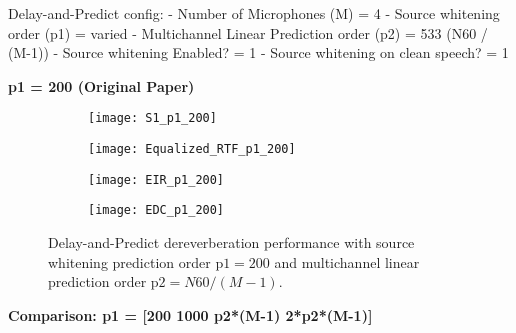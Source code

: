 Delay-and-Predict config:
- Number of Microphones (M) = 4
- Source whitening order (p1) = varied
- Multichannel Linear Prediction order (p2) = 533 (N60 / (M-1))
- Source whitening Enabled? = 1
- Source whitening on clean speech? = 1

\textbf{p1 = 200 (Original Paper)}

\begin{figure}[H]
	\centering
	\begin{subfigure}[b]{0.49\textwidth}
		\centering
		\texttt{[image: S1\_p1\_200]}
	\end{subfigure}
	\hfill
	\begin{subfigure}[b]{0.49\textwidth}
		\centering
		\texttt{[image: Equalized\_RTF\_p1\_200]}
	\end{subfigure}
	\hfill
	\begin{subfigure}[b]{0.49\textwidth}
		\centering
		\texttt{[image: EIR\_p1\_200]}
	\end{subfigure}
	\hfill
	\begin{subfigure}[b]{0.49\textwidth}
		\centering
		\texttt{[image: EDC\_p1\_200]}
	\end{subfigure}
	\hfill
	\caption{Delay-and-Predict dereverberation performance with source whitening prediction order $\mathrm{p1} = 200$ and multichannel linear prediction order $\mathrm{p2} = N60 / (M-1)$.}
	\label{fig:params_p1_200}
\end{figure}

\textbf{Comparison: p1 = [200  1000  p2*(M-1)  2*p2*(M-1)]}

